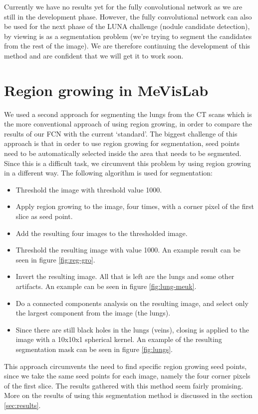 \documentclass[a4paper,10pt]{article}
\numberwithin{equation}{section} %
\numberwithin{figure}{section} %
\numberwithin{table}{section} %
\begin{document}
Currently we have no results yet for the fully convolutional network as we are still in the development phase. However, the fully convolutional network can also be used for the next phase of the LUNA challenge (nodule candidate detection), by viewing is as a segmentation problem (we're trying to segment the candidates from the rest of the image). We are therefore continuing the development of this method and are confident that we will get it to work soon.

\section{Region growing in MeVisLab}
We used a second approach for segmenting the lungs from the CT scans which is the more conventional approach of using region growing, in order to compare the results of our FCN with the current `standard'. The biggest challenge of this approach is that in order to use region growing for segmentation, seed points need to be automatically selected inside the area that needs to be segmented. Since this is a difficult task, we circumvent this problem by using region growing in a different way. The following algorithm is used for segmentation:

\begin{itemize}
\item Threshold the image with threshold value 1000.
\item Apply region growing to the image, four times, with a corner pixel of the first slice as seed point.
\item Add the resulting four images to the thresholded image.
\item Threshold the resulting image with value 1000. An example result can be seen in figure \ref{fig:reg-gro}.
\item Invert the resulting image. All that is left are the lungs and some other artifacts. An example can be seen in figure \ref{fig:lung-meuk}.
\item Do a connected components analysis on the resulting image, and select only the largest component from the image (the lungs).
\item Since there are still black holes in the lungs (veins), closing is applied to the image with a 10x10x1 spherical kernel. An example of the resulting segmentation mask can be seen in figure \ref{fig:lungs}.
\end{itemize}

\noindent This approach circumvents the need to find specific region growing seed points, since we take the same seed points for each image, namely the four corner pixels of the first slice. The results gathered with this method seem fairly promising. More on the results of using this segmentation method is discussed in the section \ref{sec:results}.
\end{document}
